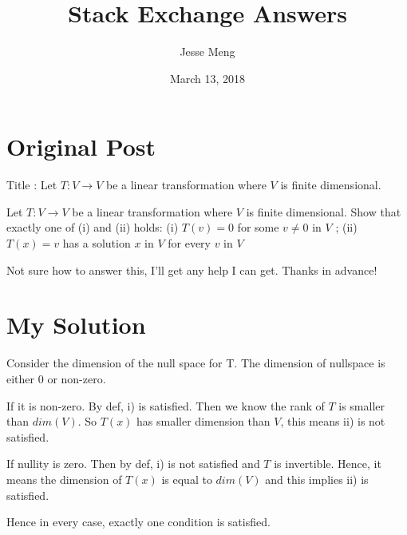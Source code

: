 \documentclass{article}
\title{Stack Exchange Answers}
\author{Jesse Meng }
\date{March 13, 2018}
\begin{document}
\maketitle

\section{Original Post}
Title : Let $T:V → V$ be a linear transformation where $V$ is finite dimensional.

Let $T:V → V$ be a linear transformation where $V$ is finite dimensional. Show that exactly one of (i) and (ii) holds:  
(i) $T(v)=0$ for some $v ≠ 0$ in $V$ ;  
(ii) $T(x)=v$ has a solution $x$ in $V$ for every $v$ in $V$

Not sure how to answer this, I'll get any help I can get. Thanks in advance!
\section{My Solution}
Consider the dimension of the null space for T. The dimension of nullspace is either $0$ or non-zero. 

If it is non-zero. By def, i) is satisfied. Then we know the rank of $T$ is smaller than $dim(V)$. So $T(x)$ has smaller dimension than $V$, this means ii) is not satisfied. 

If nullity is zero. Then by def, i) is not satisfied and $T$ is invertible. Hence, it means the dimension of $T(x)$ is equal to $dim(V)$ and this implies ii) is satisfied. 

Hence in every case, exactly one condition is satisfied.
\end{document}
